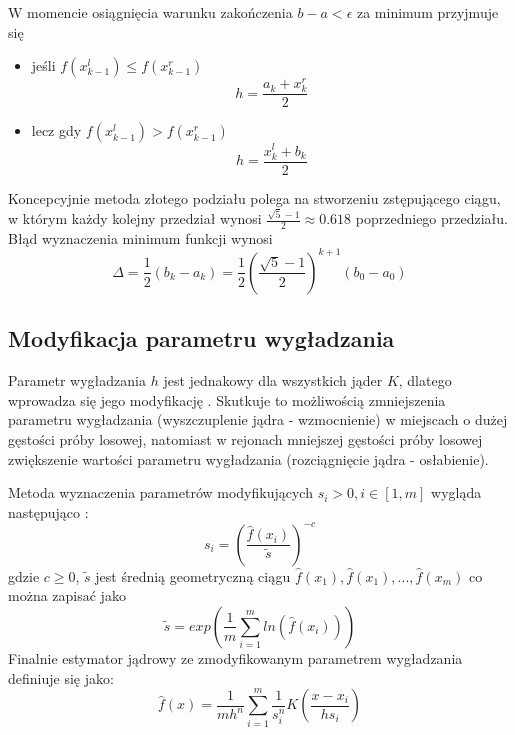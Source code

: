 W momencie osiągnięcia warunku zakończenia $b-a< \epsilon$ za minimum przyjmuje się
\begin{itemize}
\item jeśli $f(x^l_{k-1}) \leq f(x^r_{k-1}) $
	\begin{equation}
	h = \frac{a_k+x^r_k}{2}
	\end{equation}
\item lecz gdy $f(x^l_{k-1}) > f(x^r_{k-1}) $
	\begin{equation}
	h = \frac{x^l_k + b_k}{2}
	\end{equation}
\end{itemize}
Koncepcyjnie metoda złotego podziału polega na stworzeniu zstępującego ciągu, w którym każdy kolejny przedział wynosi $\frac{\sqrt{5} - 1}{2} \approx 0.618$ poprzedniego przedziału. Błąd wyznaczenia minimum funkcji wynosi
\begin{equation}
\Delta = \frac{1}{2}(b_k - a_k) = \frac{1}{2} {(\frac{\sqrt{5} - 1}{2})}^{k+1}(b_0-a_0)
\end{equation}

\subsection{Modyfikacja parametru wygładzania}
\label{subsec:modyfikacje_h}
Parametr wygładzania $h$ jest jednakowy dla wszystkich jąder $K$, dlatego wprowadza się jego modyfikację \cite{Kul05} \cite{Kul10}. Skutkuje to możliwością zmniejszenia parametru wygładzania (wyszczuplenie jądra - wzmocnienie) w miejscach o dużej gęstości próby losowej, natomiast w rejonach mniejszej gęstości próby losowej zwiększenie wartości parametru wygładzania (rozciągnięcie jądra - osłabienie).

Metoda wyznaczenia parametrów modyfikujących $s_i>0, i \in [1, m]$ wygląda następująco :
\begin{equation}
s_i= {(\frac{\hat{f}(x_i)}{\tilde{s}})}^{-c}
\end{equation}
gdzie $c \geq 0$, $\tilde{s}$ jest średnią geometryczną ciągu $\hat{f}(x_1), \hat{f}(x_1), ..., \hat{f}(x_m)$ co można zapisać jako
\begin{equation}
\tilde{s} = exp(\frac{1}{m} \displaystyle\sum_{i=1}^{m} ln(\hat{f}(x_i)) )
\end{equation} 
Finalnie estymator jądrowy ze zmodyfikowanym parametrem wygładzania definiuje się jako:
\begin{equation}
\label{eq:est_mod}
\hat{f}(x)=\frac{1}{mh^n} \displaystyle \sum_{i=1}^{m} \frac{1}{s_i^n} K(\frac{x-x_i}{hs_i})
\end{equation}

